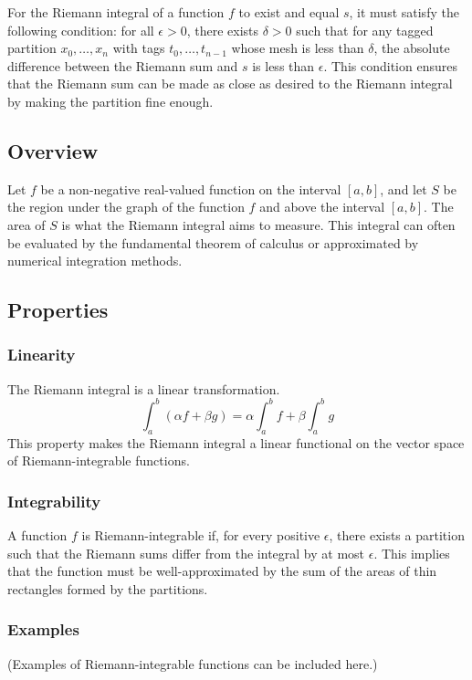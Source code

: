 \documentclass[12pt]{article}
\begin{document}
For the Riemann integral of a function \( f \) to exist and equal \( s \), it must satisfy the following condition: for all \( \epsilon > 0 \), there exists \( \delta > 0 \) such that for any tagged partition \( x_0, \ldots, x_n \) with tags \( t_0, \ldots, t_{n-1} \) whose mesh is less than \( \delta \), the absolute difference between the Riemann sum and \( s \) is less than \( \epsilon \). This condition ensures that the Riemann sum can be made as close as desired to the Riemann integral by making the partition fine enough.

\subsection{Overview}
Let \( f \) be a non-negative real-valued function on the interval \([a, b]\), and let \( S \) be the region under the graph of the function \( f \) and above the interval \([a, b]\). The area of \( S \) is what the Riemann integral aims to measure. This integral can often be evaluated by the fundamental theorem of calculus or approximated by numerical integration methods.

\subsection{Properties}
\subsubsection{Linearity}
The Riemann integral is a linear transformation.
\[
\int_a^b (\alpha f + \beta g) = \alpha \int_a^b f + \beta \int_a^b g
\]
This property makes the Riemann integral a linear functional on the vector space of Riemann-integrable functions.

\subsubsection{Integrability}
A function \( f \) is Riemann-integrable if, for every positive \( \epsilon \), there exists a partition such that the Riemann sums differ from the integral by at most \( \epsilon \). This implies that the function must be well-approximated by the sum of the areas of thin rectangles formed by the partitions.

\subsubsection{Examples}
(Examples of Riemann-integrable functions can be included here.)
\end{document}
